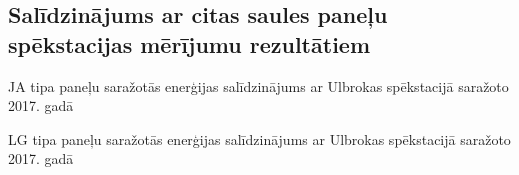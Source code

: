 \subsection{Salīdzinājums ar citas saules paneļu spēkstacijas mērījumu rezultātiem}
\begin{table}[h]
    \caption{JA tipa paneļu saražotās enerģijas salīdzinājums ar Ulbrokas spēkstacijā saražoto 2017. gadā}
    \begin{center}
    
    \end{center}
\end{table}
\begin{table}[h]
    \caption{LG tipa paneļu saražotās enerģijas salīdzinājums ar Ulbrokas spēkstacijā saražoto 2017. gadā}
    \begin{center}
    
    \end{center}
\end{table}
